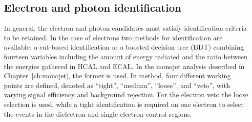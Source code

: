 \subsection{Electron and photon identification}
\label{sec:electron_ID}

In general, the electron and photon candidates must satisfy identification criteria to be retained. In the case of electrons two methods for identification are available: a cut-based identification or a boosted decision tree (BDT) combining fourteen variables including the amount of energy radiated and the ratio between the energies gathered in HCAL and ECAL. In the monojet analysis described in Chapter~\ref{ch:monojet}, the former is used. In method, four different working points are defined, denoted as ``tight'', ``medium'', ``loose'', and ``veto'', with varying signal efficiency and background rejection. For the electron veto the loose selection is used, while a tight identification is required on one electron to select the events in the dielectron and single electron control regions.

